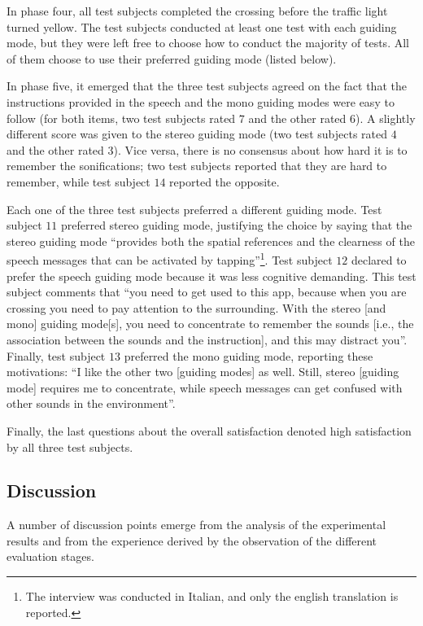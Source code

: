 \documentclass{article}
\begin{document}
In phase four, all test subjects completed the crossing before the traffic light turned yellow. The test subjects conducted at least one test with each guiding mode, but they were left free to choose how to conduct the majority of tests. All of them choose to use their preferred guiding mode (listed below).

In phase five, it emerged that the three test subjects agreed on the fact that the instructions provided in the speech and the mono guiding modes were easy to follow (for both items, two test subjects rated $7$ and the other rated $6$).
A slightly different score was given to the stereo guiding mode (two test subjects rated $4$ and the other rated $3$).
Vice versa, there is no consensus about how hard it is to remember the sonifications; two test subjects reported that they are hard to remember, while test subject $14$ reported the opposite.

Each one of the three test subjects preferred a different guiding mode. Test subject $11$ preferred stereo guiding mode, justifying the choice by saying that the stereo guiding mode ``provides both the spatial references and the clearness of the speech messages that can be activated by tapping''\footnote{The interview was conducted in Italian, and only the english translation is reported.}.
Test subject $12$ declared to prefer the speech guiding mode because it was less cognitive demanding. This test subject comments that ``you need to get used to this app, because when you are crossing you need to pay attention to the surrounding. With the stereo [and mono] guiding mode[s], you need to concentrate to remember the sounds [i.e., the association between the sounds and the instruction], and this may distract you''.
Finally, test subject $13$ preferred the mono guiding mode, reporting these motivations: ``I like the other two [guiding modes] as well. Still, stereo [guiding mode] requires me to concentrate, while speech messages can get confused with other sounds in the environment''.

Finally, the last questions about the overall satisfaction denoted high satisfaction by all three test subjects.

\subsection{Discussion}
\label{sub:discussion}

A number of discussion points emerge from the analysis of the experimental results and from the experience derived by the observation of the different evaluation stages.
\end{document}
